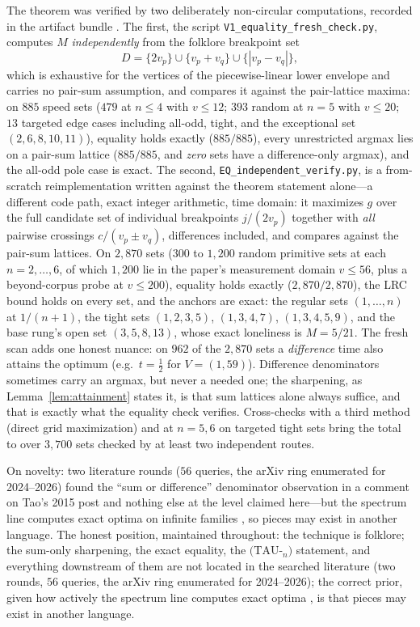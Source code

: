The theorem was verified by two deliberately non-circular computations,
recorded in the artifact bundle \cite{prog-artifacts}. The first, the
script \texttt{V1\_equality\_fresh\_check.py}, computes $M$
\emph{independently} from the folklore breakpoint set
\[
D=\{2v_p\}\cup\{v_p+v_q\}\cup\{|v_p-v_q|\},
\]
which is exhaustive for the vertices of the piecewise-linear lower
envelope and carries no pair-sum assumption, and compares it against the
pair-lattice maxima: on $885$ speed sets ($479$ at $n\le 4$ with
$v\le 12$; $393$ random at $n=5$ with $v\le 20$; $13$ targeted edge
cases including all-odd, tight, and the exceptional set
$(2,6,8,10,11)$), equality holds exactly ($885/885$), every unrestricted
argmax lies on a pair-sum lattice ($885/885$, and \emph{zero} sets have
a difference-only argmax), and the all-odd pole case is exact. The
second, \texttt{EQ\_independent\_verify.py}, is a from-scratch
reimplementation written against the theorem statement alone---a
different code path, exact integer arithmetic, time domain: it maximizes
$g$ over the full candidate set of individual breakpoints $j/(2v_p)$
together with \emph{all} pairwise crossings $c/(v_p\pm v_q)$, differences
included, and compares against the pair-sum lattices. On $2{,}870$ sets
($300$ to $1{,}200$ random primitive sets at each $n=2,\dots,6$, of which
$1{,}200$ lie in the paper's measurement domain $v\le 56$, plus a
beyond-corpus probe at $v\le 200$), equality holds exactly
($2{,}870/2{,}870$), the LRC bound holds on every set, and the anchors
are exact: the regular sets $(1,\dots,n)$ at $1/(n{+}1)$, the tight sets
$(1,2,3,5)$, $(1,3,4,7)$, $(1,3,4,5,9)$, and the base rung's open set
$(3,5,8,13)$, whose exact loneliness is $M=5/21$. The fresh scan adds
one honest nuance: on $962$ of the $2{,}870$ sets a \emph{difference}
time also attains the optimum (e.g.\ $t=\tfrac12$ for $V=(1,59)$).
Difference denominators sometimes carry an argmax, but never a needed
one; the sharpening, as Lemma~\ref{lem:attainment} states it, is that
sum lattices alone always suffice, and that is exactly what the
equality check verifies. Cross-checks with a third method (direct grid
maximization) and at $n=5,6$ on targeted tight sets bring the total to
over $3{,}700$ sets checked by at least two independent routes.

On novelty: two literature rounds ($56$ queries, the arXiv ring
enumerated for 2024--2026) found the ``sum or difference'' denominator
observation in a comment on Tao's 2015 post \cite{Tao-blog} and nothing
else at the level claimed here---but the spectrum line computes exact
optima on infinite families \cite{Cordella}, so pieces may exist in
another language. The honest position, maintained throughout: the
technique is folklore; the sum-only sharpening, the exact equality, the
$(\mathrm{TAU}$-$_n)$ statement, and everything downstream of them are
not located in the searched literature (two rounds, $56$ queries, the
arXiv ring enumerated for 2024--2026); the correct prior, given how
actively the spectrum line computes exact optima \cite{Cordella}, is
that pieces may exist in another language.

